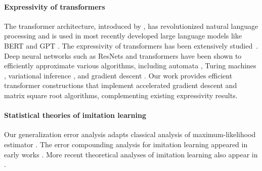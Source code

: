 \paragraph{Expressivity of transformers} The transformer architecture, introduced by \cite{vaswani2017attention}, has revolutionized natural language processing and is used in most recently developed large language models like BERT and GPT \citep{devlin2018bert, brown2020language}. The expressivity of transformers has been extensively studied~\citep{yun2019transformers, perez2019turing, hron2020infinite,yao2021self, bhattamishra2020computational, zhang2022unveiling, liu2022transformers, wei2022statistically, fu2023can, bai2023transformers, akyurek2022learning, von2023transformers}. Deep neural networks such as ResNets and transformers have been shown to efficiently approximate various algorithms, including automata \citep{liu2022transformers}, Turing machines \citep{wei2022statistically}, variational inference \citep{mei2023deep}, and gradient descent \citep{bai2023transformers, akyurek2022learning, von2023transformers}. Our work provides efficient transformer constructions that implement accelerated gradient descent and matrix square root algorithms, complementing existing expressivity results. 





\paragraph{Statistical theories of imitation learning} Our generalization error analysis adapts classical analysis of maximum-likelihood estimator \citep{geer2000empirical}. The error compounding analysis for imitation learning appeared in early works \citep{ross2011reduction, ross2010efficient}. More recent theoretical analyses of imitation learning also appear in \cite{rajaraman2020toward, rajaraman2021provably, rashidinejad2021bridging}. 







